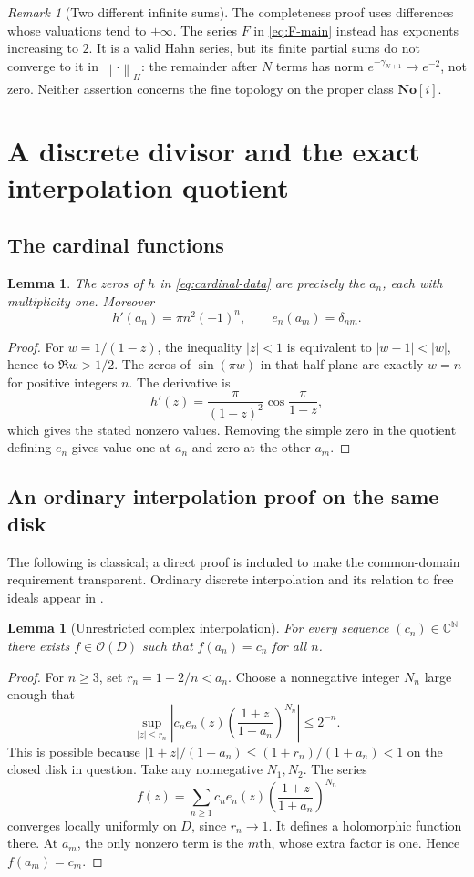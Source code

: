 \documentclass[11pt,letterpaper]{article}
\numberwithin{equation}{section}
\newtheorem{lemma}[theorem]{Lemma}
\theoremstyle{definition}
\theoremstyle{remark}
\newtheorem{remark}[theorem]{Remark}
\newcommand{\C}{\mathbb C}
\newcommand{\N}{\mathbb N}
\newcommand{\No}{\mathbf{No}}
\newcommand{\OO}{\mathcal O}
\newcommand{\norm}[1]{\left\lVert#1\right\rVert}
\begin{document}
\begin{remark}[Two different infinite sums]
The completeness proof uses differences whose valuations tend to
$+\infty$. The series $F$ in \eqref{eq:F-main} instead has exponents
increasing to $2$. It is a valid Hahn series, but its finite partial sums
do not converge to it in $\norm{\cdot}_H$: the remainder after $N$ terms
has norm $e^{-\gamma_{N+1}}\to e^{-2}$, not zero. Neither assertion
concerns the fine topology on the proper class $\No[i]$.
\end{remark}

\section{A discrete divisor and the exact interpolation quotient}
\label{sec:interpolation}

\subsection{The cardinal functions}
\begin{lemma}\label{lem:cardinal}
The zeros of $h$ in \eqref{eq:cardinal-data} are precisely the $a_n$,
each with multiplicity one. Moreover
\[
 h'(a_n)=\pi n^2(-1)^n,\qquad e_n(a_m)=\delta_{nm}.
\]
\end{lemma}
\begin{proof}
For $w=1/(1-z)$, the inequality $|z|<1$ is equivalent to
$|w-1|<|w|$, hence to $\Re w>1/2$. The zeros of $\sin(\pi w)$ in that
half-plane are exactly $w=n$ for positive integers $n$. The derivative
is
\[
 h'(z)=\frac{\pi}{(1-z)^2}\cos\frac{\pi}{1-z},
\]
which gives the stated nonzero values. Removing the simple zero in the
quotient defining $e_n$ gives value one at $a_n$ and zero at the other
$a_m$.
\end{proof}

\subsection{An ordinary interpolation proof on the same disk}
The following is classical; a direct proof is included to make the
common-domain requirement transparent. Ordinary discrete interpolation
and its relation to free ideals appear in \cite{Henriksen52,Henriksen53}.

\begin{lemma}[Unrestricted complex interpolation]\label{lem:ordinary-interp}
For every sequence $(c_n)\in\C^\N$ there exists $f\in\OO(D)$ such that
$f(a_n)=c_n$ for all $n$.
\end{lemma}
\begin{proof}
For $n\ge3$, set $r_n=1-2/n<a_n$. Choose a nonnegative integer $N_n$
large enough that
\[
 \sup_{|z|\le r_n}
 \left|c_ne_n(z)\left(\frac{1+z}{1+a_n}\right)^{N_n}\right|
 \le2^{-n}.
\]
This is possible because $|1+z|/(1+a_n)\le(1+r_n)/(1+a_n)<1$ on the
closed disk in question. Take any nonnegative $N_1,N_2$. The series
\[
 f(z)=\sum_{n\ge1}c_ne_n(z)
                    \left(\frac{1+z}{1+a_n}\right)^{N_n}
\]
converges locally uniformly on $D$, since $r_n\to1$. It defines a
holomorphic function there. At $a_m$, the only nonzero term is the
$m$th, whose extra factor is one. Hence $f(a_m)=c_m$.
\end{proof}
\end{document}
